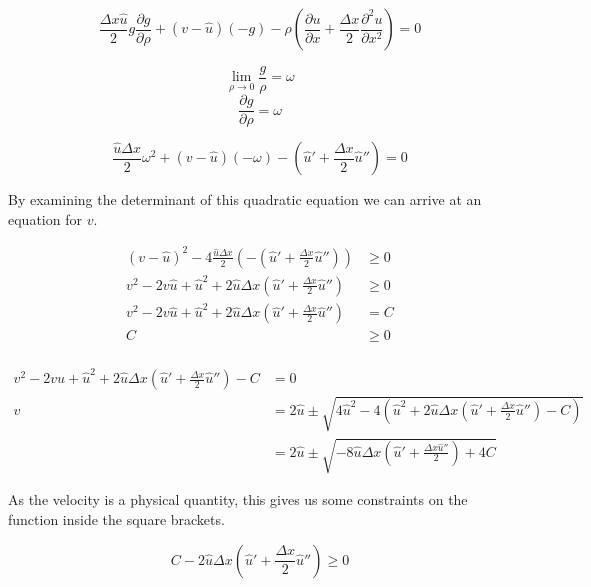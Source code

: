 \documentclass[a4paper]{article}
\begin{document}
\begin{equation}
\frac{\Delta x \hat{u}}{2} g \frac{\partial g}{\partial \rho} + ( v - \hat{u} ) (-g) - \rho \left( \frac{\partial u}{\partial x} + \frac{\Delta x}{2} \frac{\partial ^2 u}{\partial x ^2 } \right)  = 0 
\end{equation}

$$\lim _{\rho \rightarrow 0} \frac{g}{\rho} = \omega $$
$$ \frac{\partial g}{\partial \rho} = \omega $$

\begin{equation}
\frac{\hat{u} \Delta x }{2} \omega ^2 + ( v - \hat{u} ) ( - \omega ) - \left( \hat{u} ' + \frac{\Delta x}{2} \hat{u}'' \right) = 0 
\end{equation}

By examining the determinant of this quadratic equation we can arrive at an equation for $v$. 

\begin{align*}
(v - \hat{u} )^2 - 4 \frac{\hat{u} \Delta x}{2} \left( - \left( \hat{u} ' + \frac{\Delta x}{2} \hat{u}'' \right) \right) & \geq 0 \\
v ^2   - 2 v \hat{u} + \hat{u} ^2 + 2 \hat{u} \Delta x \left( \hat{u} ' + \frac{\Delta x}{2} \hat{u} '' \right) & \geq 0 \\
v ^2   - 2 v \hat{u} + \hat{u} ^2 + 2 \hat{u} \Delta x \left( \hat{u} ' + \frac{\Delta x}{2} \hat{u} '' \right) & = C \\
C &  \geq 0 \\
\end{align*}

\begin{align*}
v ^2   - 2 v \hat{u} + \hat{u} ^2 + 2 \hat{u} \Delta x \left( \hat{u} ' + \frac{\Delta x}{2} \hat{u} '' \right) - C & = 0 \\
v & = 2 \hat{u} \pm \sqrt{4 \hat{u} ^ 2 - 4 \left( \hat{u} ^2 + 2 \hat{u} \Delta x \left( \hat{u} ' + \frac{\Delta x}{2} \hat{u} '' \right) - C \right) }\\
&= 2 \hat{u} \pm \sqrt{-8 \hat{u} \Delta x \left( \hat{u} ' + \frac{\Delta x \hat{u} ''}{2 } \right) + 4 C}
\end{align*}

As the velocity is a physical quantity, this gives us some constraints on the function inside the square brackets. 


\begin{equation}
C - 2 \hat{u} \Delta x \left( \hat{u} ' + \frac{\Delta x}{2} \hat{u} '' \right)  \geq 0 
\end{equation}
\end{document}
